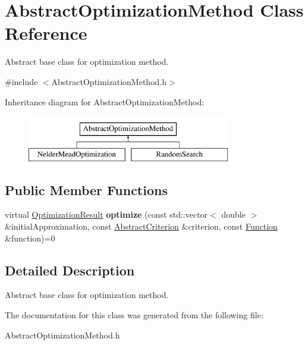 \hypertarget{class_abstract_optimization_method}{}\section{Abstract\+Optimization\+Method Class Reference}
\label{class_abstract_optimization_method}


Abstract base class for optimization method.  




{\ttfamily \#include $<$Abstract\+Optimization\+Method.\+h$>$}

Inheritance diagram for Abstract\+Optimization\+Method\+:\begin{figure}[H]
\begin{center}
\leavevmode
\includegraphics[height=2.000000cm]{class_abstract_optimization_method}
\end{center}
\end{figure}
\subsection*{Public Member Functions}
\begin{DoxyCompactItemize}
\item 
\mbox{\label{class_abstract_optimization_method_ace558586052fec5b791cb90ad4f49ef6}} 
virtual \hyperlink{class_optimization_result}{Optimization\+Result} {\bfseries optimize} (const std\+::vector$<$ double $>$ \&initial\+Approximation, const \hyperlink{class_abstract_criterion}{Abstract\+Criterion} \&criterion, const \hyperlink{class_function}{Function} \&function)=0
\end{DoxyCompactItemize}


\subsection{Detailed Description}
Abstract base class for optimization method. 

The documentation for this class was generated from the following file\+:\begin{DoxyCompactItemize}
\item 
Abstract\+Optimization\+Method.\+h\end{DoxyCompactItemize}
